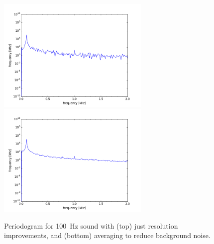 \documentclass[12pt]{article}
\begin{document}
\begin{figure}[htbp]
\begin{center}
{\includegraphics[width=0.65\textwidth]{figs/res100hz.png}} \\
{\includegraphics[width=0.65\textwidth]{figs/avg100hz.png}}
\end{center}
\caption{\label{fig:periodogram2} Periodogram for 100~Hz sound with (top) just resolution improvements, and (bottom) averaging to reduce background noise. }
\end{figure}
\end{document}
